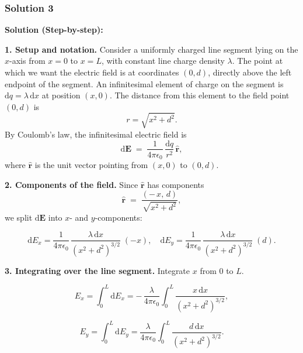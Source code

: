 \documentclass{article}
\begin{document}
\subsubsection{Solution 3}

\textbf{Solution (Step-by-step):}

\noindent
\textbf{1. Setup and notation.} 
Consider a uniformly charged line segment lying on the $x$-axis from $x=0$ to $x=L$, 
with constant line charge density $\lambda$. 
The point at which we want the electric field is at coordinates $(0,d)$, 
directly above the left endpoint of the segment. 
An infinitesimal element of charge on the segment is $\mathrm{d}q = \lambda\,\mathrm{d}x$ at position $(x,0)$. 
The distance from this element to the field point $(0,d)$ is 
\[
r = \sqrt{x^2 + d^2}.
\]
By Coulomb's law, the infinitesimal electric field is
\[
\mathrm{d}\mathbf{E} \;=\; \frac{1}{4\pi\epsilon_0}\,\frac{\mathrm{d}q}{r^2}\,\hat{\mathbf{r}},
\]
where $\hat{\mathbf{r}}$ is the unit vector pointing from $(x,0)$ to $(0,d)$.  

\bigskip
\noindent
\textbf{2. Components of the field.} 
Since $\hat{\mathbf{r}}$ has components
\[
\hat{\mathbf{r}} \;=\; \frac{(-\,x,\,d)}{\sqrt{x^2 + d^2}},
\]
we split $\mathrm{d}\mathbf{E}$ into $x$- and $y$-components:

\[
\mathrm{d}E_x 
= \frac{1}{4\pi\epsilon_0}\,\frac{\lambda\,\mathrm{d}x}{(x^2 + d^2)^{3/2}}\;(-x),
\quad
\mathrm{d}E_y 
= \frac{1}{4\pi\epsilon_0}\,\frac{\lambda\,\mathrm{d}x}{(x^2 + d^2)^{3/2}}\;(d).
\]

\bigskip
\noindent
\textbf{3. Integrating over the line segment.} 
Integrate $x$ from $0$ to $L$.  

\[
E_x 
= \int_0^L \mathrm{d}E_x 
= -\,\frac{\lambda}{4\pi\epsilon_0}\int_{0}^{L}
\frac{x\,\mathrm{d}x}{(x^2 + d^2)^{3/2}}, 
\]

\[
E_y 
= \int_0^L \mathrm{d}E_y 
= \frac{\lambda}{4\pi\epsilon_0}\int_{0}^{L}
\frac{d\,\mathrm{d}x}{(x^2 + d^2)^{3/2}}.
\]
\end{document}
